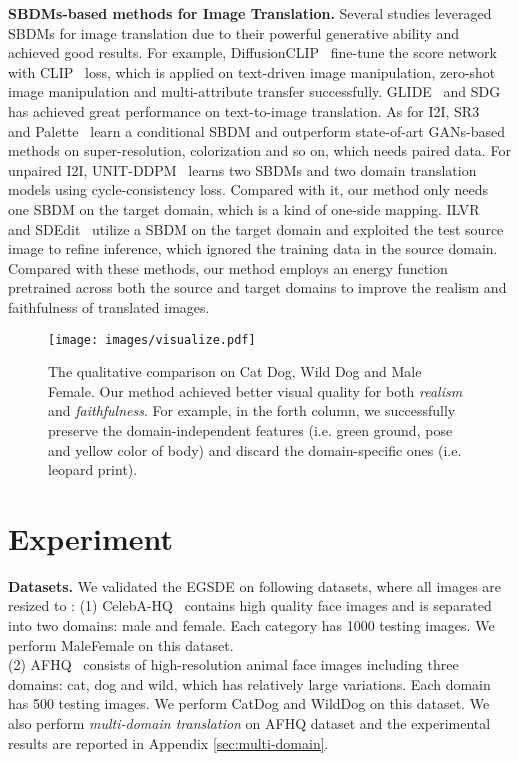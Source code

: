 \documentclass{article}
\begin{document}
\textbf{SBDMs-based methods for Image Translation.}
Several studies leveraged SBDMs for image translation due to their powerful generative ability and achieved good results. For example, DiffusionCLIP~\cite{kim2022diffusionclip} fine-tune the score network with CLIP~\cite{radford2021learning} loss, which is applied on text-driven image manipulation, zero-shot image manipulation and multi-attribute transfer successfully. GLIDE~\cite{nichol2021glide} and SDG~\cite{liu2021more} has achieved great performance on text-to-image translation. As for I2I, SR3~\cite{saharia2022image} and Palette~\cite{saharia2022palette} learn a conditional SBDM and outperform state-of-art GANs-based methods on super-resolution, colorization and so on, which needs paired data. For unpaired I2I, UNIT-DDPM~\cite{sasaki2021unit} learns two SBDMs and two domain translation models using cycle-consistency loss. Compared with it, our method only needs one SBDM on the target domain, which is a kind of one-side mapping. ILVR~\cite{choi2021ilvr} and SDEdit~\cite{meng2021sdedit} utilize a SBDM on the target domain and exploited the test source image to refine inference, which ignored the training data in the source domain. Compared with these methods, our method employs an energy function pretrained across both the source and target domains to improve the realism and faithfulness of translated images.
\begin{figure}
  \centering
  \texttt{[image: images/visualize.pdf]}
  \caption{The qualitative comparison on Cat  Dog, Wild  Dog and Male  Female. Our method achieved better visual quality for both \emph{realism} and \emph{faithfulness}. For example, in the forth column, we successfully preserve the domain-independent features (i.e. green ground, pose and yellow color of body) and discard the domain-specific ones (i.e. leopard print).}
  \vspace{-0.5cm}
  \label{fig:qualitative results}
\end{figure}

\section{Experiment} 
\label{sec:Implementation}
\textbf{Datasets.} We validated the EGSDE on following datasets, where all images are resized to : (1) CelebA-HQ~\cite{karras2018progressive} contains high quality face images and is separated into two domains: male and
female. Each category
has 1000 testing images. 
We perform MaleFemale on this dataset. \\
(2) AFHQ~\cite{choi2020stargan} consists of high-resolution animal face images including three domains: cat, dog and wild, which has relatively large variations. Each domain has 500 testing images. 
We perform CatDog and WildDog on this dataset. We also perform \emph{multi-domain translation} on AFHQ dataset and the experimental results are reported in Appendix \ref{sec:multi-domain}. 
\end{document}
